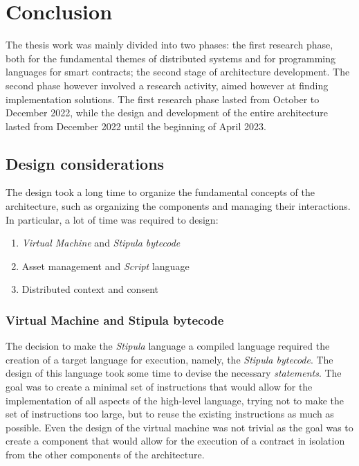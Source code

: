
\chapter{Conclusion}
\label{cap:conclusions}

The thesis work was mainly divided into two phases: the first research phase, both for the fundamental 
themes of distributed systems and for programming languages for smart contracts; the second stage of 
architecture development. The second phase however involved a research activity, aimed however at finding 
implementation solutions. The first research phase lasted from October to December 2022, while the design 
and development of the entire architecture lasted from December 2022 until the beginning of April 2023.

\section{Design considerations}

The design took a long time to organize the fundamental concepts of the architecture, such as organizing 
the components and managing their interactions. In particular, a lot of time was required to design:
\begin{enumerate}
  \item \textit{Virtual Machine} and \textit{Stipula bytecode}
  \item Asset management and \textit{Script} language
  \item Distributed context and consent
\end{enumerate}

\subsection{Virtual Machine and Stipula bytecode}

The decision to make the \textit{Stipula} language a compiled language required the creation of a target 
language for execution, namely, the \textit{Stipula bytecode}. The design of this language took some time 
to devise the necessary \textit{statements}. The goal was to create a minimal set of instructions that 
would allow for the implementation of all aspects of the high-level language, trying not to make the set 
of instructions too large, but to reuse the existing instructions as much as possible. Even the design of 
the virtual machine was not trivial as the goal was to create a component that would allow for the 
execution of a contract in isolation from the other components of the architecture.

